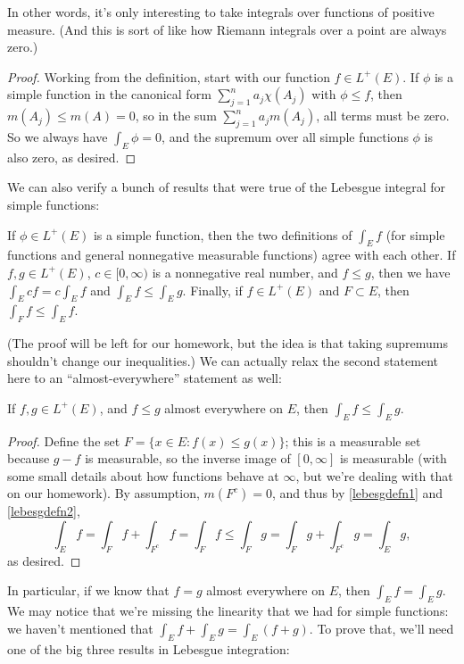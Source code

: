 In other words, it's only interesting to take integrals over functions of positive measure. (And this is sort of like how Riemann integrals over a point are always zero.)

\begin{proof}
Working from the definition, start with our function $f \in L^+(E)$. If $\phi$ is a simple function in the canonical form $\sum_{j=1}^n a_j \chi(A_j)$ with $\phi \le f$, then $m(A_j) \le m(A) = 0$, so in the sum $\sum_{j=1}^n a_j m(A_j)$, all terms must be zero. So we always have $\int_E \phi = 0$, and the supremum over all simple functions $\phi$ is also zero, as desired.
\end{proof}

We can also verify a bunch of results that were true of the Lebesgue integral for simple functions:

\begin{proposition}\label{lebesgdefn2}
If $\phi \in L^+(E)$ is a simple function, then the two definitions of $\int_E f$ (for simple functions and general nonnegative measurable functions) agree with each other. If $f, g \in L^+(E)$, $c \in [0, \infty)$ is a nonnegative real number, and $f \le g$, then we have $\int_E cf = c \int_E f$ and $\int_E f \le \int_E g$. Finally, if $f \in L^+(E)$ and $F \subset E$, then $\int_F f \le \int_E f$.
\end{proposition}

(The proof will be left for our homework, but the idea is that taking supremums shouldn't change our inequalities.) We can actually relax the second statement here to an ``almost-everywhere'' statement as well:

\begin{proposition}
If $f, g \in L^+(E)$, and $f \le g$ almost everywhere on $E$, then $\int_E f \le \int_E g$.
\end{proposition}
\begin{proof}
Define the set $F = \{x \in E: f(x) \le g(x)\}$; this is a measurable set because $g - f$ is measurable, so the inverse image of $[0, \infty]$ is measurable (with some small details about how functions behave at $\infty$, but we're dealing with that on our homework). By assumption, $m(F^c) = 0$, and thus by \cref{lebesgdefn1} and \cref{lebesgdefn2},
\[
    \int_E f = \int_{F} f + \int_{F^c} f = \int_F f \le \int_F g = \int_F g + \int_{F^c} g = \int_E g,
\]
as desired.
\end{proof}

In particular, if we know that $f = g$ almost everywhere on $E$, then $\int_E f = \int_E g$. We may notice that we're missing the linearity that we had for simple functions: we haven't mentioned that $\int_E f + \int_E g = \int_E (f+g)$. To prove that, we'll need one of the big three results in Lebesgue integration:

